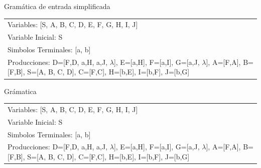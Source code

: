 \documentclass[a4paper,11pt]{article}
\newcommand{\MYp}[1]{ {\color[rgb]{0.392,0.392,0.392}#1} }
\begin{document}
\MYp{\Huge Gram\'{a}tica de entrada simplificada\newline
\newline
}
\begin{center}\begin{tabular}{ m{15cm} }


Variables: [S, A, B, C, D, E, F, G, H, I, J] \\
Variable Inicial: S \\
Simbolos Terminales: [a, b] \\
Producciones: {D=[F,D, a,H, a,J, $\lambda$], E=[a,H], F=[a,I], G=[a,J, $\lambda$], A=[F,A], B=[F,B], S=[A, B, C, D], C=[F,C], H=[b,E], I=[b,F], J=[b,G]} \\

\end{tabular}
\end{center}\newpage
\MYp{\Huge Gr\'amatica}
\newline
\begin{center}\begin{tabular}{ m{15cm} }


Variables: [S, A, B, C, D, E, F, G, H, I, J] \\
Variable Inicial: S \\
Simbolos Terminales: [a, b] \\
Producciones: {D=[F,D, a,H, a,J, $\lambda$], E=[a,H], F=[a,I], G=[a,J, $\lambda$], A=[F,A], B=[F,B], S=[A, B, C, D], C=[F,C], H=[b,E], I=[b,F], J=[b,G]} \\

\end{tabular}
\end{center}
\end{document}
